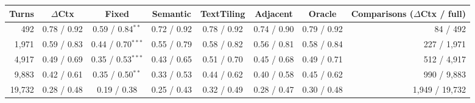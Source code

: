 \begin{tabular}{rccccccr}
\toprule
Turns & $\Delta$Ctx & Fixed & Semantic & TextTiling & Adjacent & Oracle & Comparisons ($\Delta$Ctx / full) \\
\midrule
492 & 0.78 / 0.92 & 0.59 / 0.84$^{**}$ & 0.72 / 0.92 & 0.78 / 0.92 & 0.74 / 0.90 & 0.79 / 0.92 & 84 / 492 \\
1,971 & 0.59 / 0.83 & 0.44 / 0.70$^{***}$ & 0.55 / 0.79 & 0.58 / 0.82 & 0.56 / 0.81 & 0.58 / 0.84 & 227 / 1,971 \\
4,917 & 0.49 / 0.69 & 0.35 / 0.53$^{***}$ & 0.43 / 0.65 & 0.51 / 0.70 & 0.45 / 0.68 & 0.49 / 0.71 & 512 / 4,917 \\
9,883 & 0.42 / 0.61 & 0.35 / 0.50$^{**}$ & 0.33 / 0.53 & 0.44 / 0.62 & 0.40 / 0.58 & 0.45 / 0.62 & 990 / 9,883 \\
19,732 & 0.28 / 0.48 & 0.19 / 0.38 & 0.25 / 0.43 & 0.32 / 0.49 & 0.28 / 0.47 & 0.30 / 0.48 & 1,949 / 19,732 \\
\bottomrule
\end{tabular}
